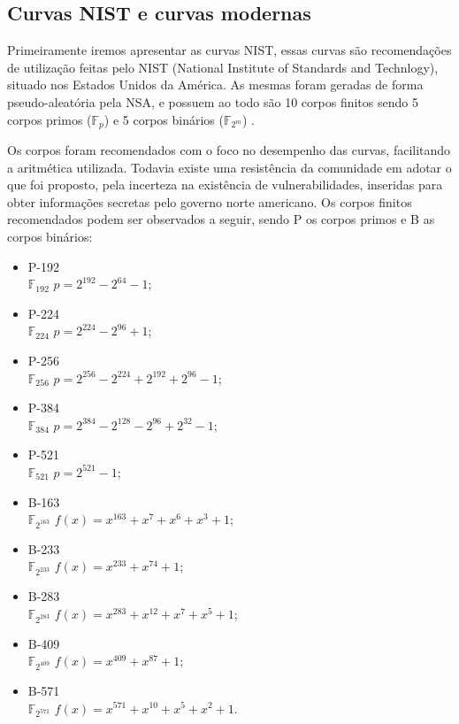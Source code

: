 \subsection{Curvas NIST e curvas modernas}
Primeiramente iremos apresentar as curvas NIST, essas curvas são recomendações de utilização feitas pelo NIST (National Institute of Standards and Technlogy), situado nos Estados Unidos da América. As mesmas foram geradas de forma pseudo-aleatória pela NSA, e possuem ao todo são 10 corpos finitos sendo 5 corpos primos ($\mathbb{F}_p$) e 5 corpos binários ($\mathbb{F}_{2^m}$) \cite{Brown2001}.

Os corpos foram recomendados com o foco no desempenho das curvas, facilitando a aritmética utilizada. Todavia existe uma resistência da comunidade em adotar o que foi proposto, pela incerteza na existência de vulnerabilidades, inseridas para obter informações secretas pelo governo norte americano. Os corpos finitos recomendados podem ser observados a seguir, sendo P os corpos primos e B as corpos binários:

\begin{multicols}{2}
\begin{itemize}
\item P-192 \\ $\mathbb{F}_{192}$ $p = 2^{192} - 2^{64} - 1$; 
\item P-224 \\ $\mathbb{F}_{224}$ $p = 2^{224} - 2^{96} + 1$;
\item P-256 \\ $\mathbb{F}_{256}$ $p = 2^{256} - 2^{224} + 2^{192} + 2^{96} - 1$;
\item P-384 \\ $\mathbb{F}_{384}$ $p = 2^{384} - 2^{128} - 2^{96} + 2^{32} - 1$;
\item P-521 \\ $\mathbb{F}_{521}$ $p = 2^{521} - 1$;
\item B-163 \\ $\mathbb{F}_{2^{163}}$ $f(x) = x^{163} + x^7 + x^6 + x^3 + 1$;
\item B-233 \\ $\mathbb{F}_{2^{233}}$ $f(x) = x^{233} + x^{74} + 1$;
\item B-283 \\ $\mathbb{F}_{2^{283}}$ $f(x) = x^{283} + x^{12} + x^7 + x^5 + 1$;
\item B-409 \\ $\mathbb{F}_{2^{409}}$ $f(x) = x^{409} + x ^{87} + 1$;
\item B-571 \\ $\mathbb{F}_{2^{571}}$ $f(x) = x^{571} + x^{10} + x^5 + x^2 + 1$.
\end{itemize}
\end{multicols}

